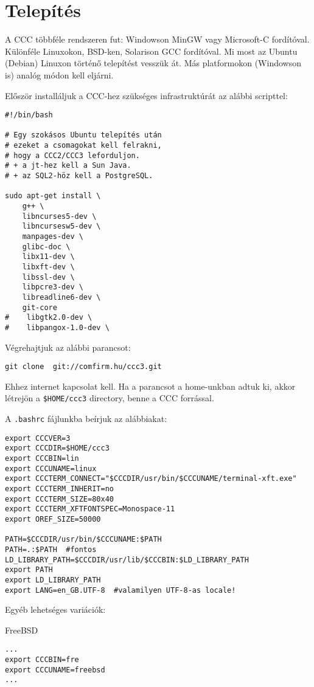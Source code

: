 
\section{Telepítés}\label{INSTALL}

A CCC többféle rendszeren fut: 
Windowson MinGW vagy Microsoft-C fordítóval.
Különféle Linuxokon, BSD-ken, Solarison GCC fordítóval.
Mi most az Ubuntu (Debian) Linuxon történő telepítést vesszük át.
Más platformokon (Windowson is) analóg módon kell eljárni.

Először  installáljuk a CCC-hez szükséges infrastruktúrát
az alábbi scripttel:

\begin{verbatim}
#!/bin/bash

# Egy szokásos Ubuntu telepítés után
# ezeket a csomagokat kell felrakni,
# hogy a CCC2/CCC3 leforduljon.
# + a jt-hez kell a Sun Java.
# + az SQL2-höz kell a PostgreSQL.

sudo apt-get install \
    g++ \
    libncurses5-dev \
    libncursesw5-dev \
    manpages-dev \
    glibc-doc \
    libx11-dev \
    libxft-dev \
    libssl-dev \
    libpcre3-dev \
    libreadline6-dev \
    git-core
#    libgtk2.0-dev \
#    libpangox-1.0-dev \
\end{verbatim}

Végrehajtjuk az alábbi parancsot:
\begin{verbatim}
git clone  git://comfirm.hu/ccc3.git
\end{verbatim}
Ehhez internet kapcsolat kell. Ha a parancsot a home-unkban adtuk ki, 
akkor létrejön a \verb!$HOME/ccc3! directory, benne a CCC forrással.

A \verb!.bashrc! fájlunkba beírjuk az alábbiakat:

\begin{verbatim}
export CCCVER=3
export CCCDIR=$HOME/ccc3
export CCCBIN=lin
export CCCUNAME=linux
export CCCTERM_CONNECT="$CCCDIR/usr/bin/$CCCUNAME/terminal-xft.exe"
export CCCTERM_INHERIT=no
export CCCTERM_SIZE=80x40
export CCCTERM_XFTFONTSPEC=Monospace-11
export OREF_SIZE=50000

PATH=$CCCDIR/usr/bin/$CCCUNAME:$PATH
PATH=.:$PATH  #fontos
LD_LIBRARY_PATH=$CCCDIR/usr/lib/$CCCBIN:$LD_LIBRARY_PATH
export PATH 
export LD_LIBRARY_PATH
export LANG=en_GB.UTF-8  #valamilyen UTF-8-as locale!
\end{verbatim}

Egyéb lehetséges variációk:

FreeBSD
\begin{verbatim}
...
export CCCBIN=fre
export CCCUNAME=freebsd
...
\end{verbatim}

